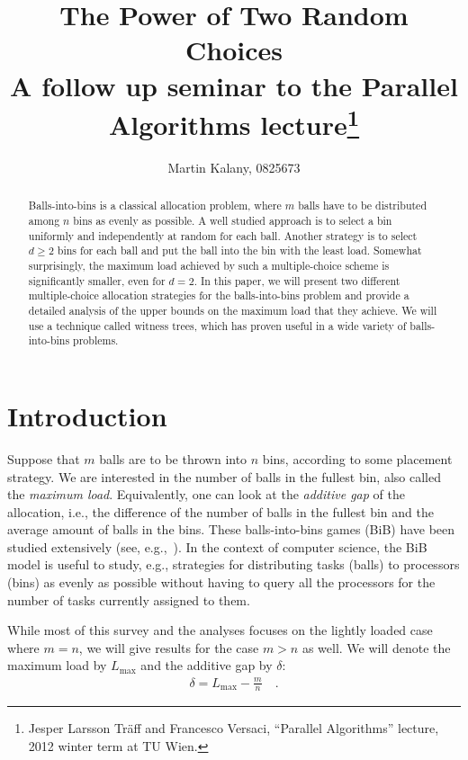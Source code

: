 \documentclass[a4paper,12pt]{article}
\newcommand\load{L_{\mathrm{max}}}
\begin{document}
\title{The Power of Two Random Choices\\ 
\large A follow up seminar to the Parallel Algorithms lecture\footnote{Jesper Larsson Tr\"aff and Francesco Versaci, ``Parallel Algorithms'' lecture, 2012 winter term at TU Wien.}}
\author{Martin Kalany, 0825673}
\maketitle

\begin{abstract}
Balls-into-bins is a classical allocation problem, where $m$ balls have to be distributed among $n$ bins as evenly as possible. A well studied approach is to select a bin uniformly and independently at random for each ball. Another strategy is to select $d\geq 2$ bins for each ball and put the ball into the bin with the least load. Somewhat surprisingly, the maximum load achieved by such a multiple-choice scheme is significantly smaller, even for $d=2$. In this paper, we will present two different multiple-choice allocation strategies for the balls-into-bins problem and provide a detailed analysis of the upper bounds on the maximum load that they achieve. We will use a technique called witness trees, which has proven useful in a wide variety of balls-into-bins problems.
\end{abstract}

\section{Introduction}
\label{sec:intro}
Suppose that $m$ balls are to be thrown into $n$ bins, according to some placement strategy. We are interested in the number of balls in the fullest bin, also called the \emph{maximum load}. Equivalently, one can look at the \emph{additive gap} of the allocation, i.e., the difference of the number of balls in the fullest bin and the average amount of balls in the bins. These balls-into-bins games (BiB) have been studied extensively (see, e.g.,~\cite{JK77}). In the context of computer science, the BiB model is useful to study, e.g., strategies for distributing tasks (balls) to processors (bins) as evenly as possible without having to query all the processors for the number of tasks currently assigned to them.

While most of this survey and the analyses focuses on the lightly loaded case where $m=n$, we will give results for the case $m > n$ as well. We will denote the maximum load by $\load$ and the additive gap by $\delta$:
\begin{align*}
\delta = \load - \frac{m}{n} \quad .
\end{align*}
\end{document}
